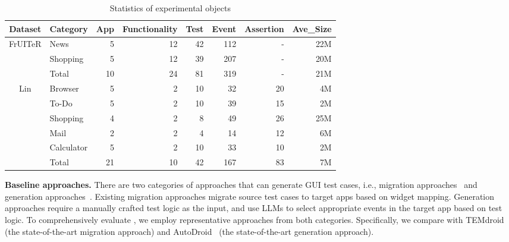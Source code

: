 \begin{table}[t]
  \centering
  \caption{Statistics of experimental objects}
    \begin{tabular}{c|l|r|r|r|r|r|r}
    \toprule
    \textbf{Dataset} & \multicolumn{1}{c|}{\textbf{Category}} & \multicolumn{1}{c|}{\textbf{App}} & \multicolumn{1}{c|}{\textbf{Functionality}} & \multicolumn{1}{c|}{\textbf{Test}} & \multicolumn{1}{c|}{\textbf{Event}} & \multicolumn{1}{c|}{\textbf{Assertion}} & \multicolumn{1}{c}{\textbf{Ave\_Size}} \\
    \midrule
    \multirow{3}[4]{*}{FrUITeR} & News  & 5     & 12    & 42    & 112   & -     & 22M \\
          & Shopping & 5     & 12    & 39    & 207   & -     & 20M \\
\cmidrule{2-8}          & Total & 10    & 24    & 81    & 319   & -     & 21M \\
    \midrule
    \multirow{6}[4]{*}{Lin} & Browser & 5     & 2     & 10    & 32    & 20    & 4M \\
          & To-Do & 5     & 2     & 10    & 39    & 15    & 2M \\
          & Shopping & 4     & 2     & 8     & 49    & 26    & 25M \\
          & Mail  & 2     & 2     & 4     & 14    & 12    & 6M \\
          & Calculator & 5     & 2     & 10    & 33    & 10    & 2M \\
\cmidrule{2-8}          & Total & 21    & 10    & 42    & 167   & 83    & 7M \\
    \bottomrule
    \end{tabular}%
  \label{tab:benchmark}%
\end{table}%


\textbf{Baseline approaches.}
There are two categories of approaches that can generate GUI test cases, i.e., migration approaches~\cite{hu2018appflow,lin2019test, zhang2024learning, behrang2019test, liu2023test} and generation approaches~\cite{wen2023droidbot,wen2023empowering, taeb2023axnav, gao2023assistgui}. 
Existing migration approaches migrate source test cases to target apps based on widget mapping.
Generation approaches require a manually crafted test logic as the input, and use LLMs to select appropriate events in the target app based on test logic. 
To comprehensively evaluate \toolNameSmall{}, we employ representative approaches from both categories. Specifically,
we compare \toolNameSmall{} with  TEMdroid~\cite{zhang2024learning} (the state-of-the-art migration approach) and AutoDroid~\cite{wen2023empowering} (the state-of-the-art generation approach).






